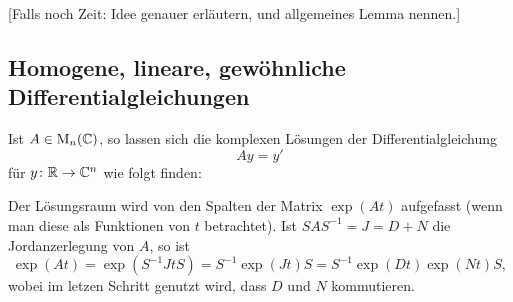 [Falls noch Zeit: Idee genauer erläutern, und allgemeines Lemma nennen.]










\subsection{Homogene, lineare, gewöhnliche Differentialgleichungen}


Ist $A \in \mathrm{M}_n(\mathbb{C})$, so lassen sich die komplexen Lösungen der Differentialgleichung
\[
  A y = y'
\]
für $y \colon \mathbb{R} \to \mathbb{C}^n$ wie folgt finden:

Der Lösungsraum wird von den Spalten der Matrix $\exp(At)$ aufgefasst (wenn man diese als Funktionen von $t$ betrachtet).
Ist $S A S^{-1} = J = D + N$ die Jordanzerlegung von $A$, so ist
\[
    \exp(At)
  = \exp(S^{-1} Jt S)
  = S^{-1} \exp(Jt) S
  = S^{-1} \exp(Dt) \exp(Nt) S,
\]
wobei im letzen Schritt genutzt wird, dass $D$ und $N$ kommutieren.










